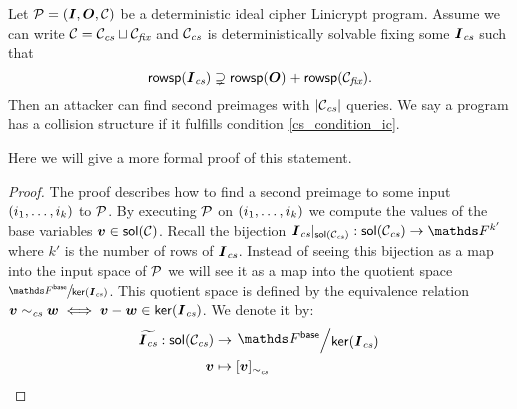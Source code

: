 \begin{prop}
\label{collision_structure_implies_attack_ic}
    Let $\P = (\I, \O, \C)$ be a deterministic ideal cipher Linicrypt program.
    Assume we can write $\C = \Ccs \sqcup \Cfix$ and
    $\Ccs$ is deterministically solvable fixing some $\Ics$ such that
    \begin{equation}
    \label{cs_condition_ic}
        \rowsp(\Ics) \supsetneq \rowsp(\O) + \rowsp(\Cfix).
    \end{equation}
    Then an attacker can find second preimages with $|\Ccs|$ queries.
    We say a program has a collision structure if it fulfills condition \eqref{cs_condition_ic}.
\end{prop}

Here we will give a more formal proof of this statement.
\begin{proof}
    The proof describes how to find a second preimage to some input $(\dts i k)$ to $\P$.
    By executing $\P$ on $(\dts i k)$ we compute the values of the base variables $\vv \in \sol(\C)$.
    Recall the bijection $\Ics|_{\sol(\Ccs)}: \sol(\Ccs) \to \F^{k'}$ where $k'$ is the number of rows of $\Ics$. 
    Instead of seeing this bijection as a map into the input space of $\P$ we will see it as a map into the quotient space
    $\sfrac{\Fsp}{\ker(\Ics)}$.
    This quotient space is defined by the equivalence relation $\vv \; \simcs \; \vw \iff \vv - \vw \in \ker(\Ics)$.
    We denote it by:
    \begin{align*}
    \widetilde\Ics: \sol(\Ccs) &\to \bigslant{\Fsp}{\ker(\Ics)} \\
    \vv &\mapsto [\vv]_\simcs
    \end{align*}
    

\end{proof}
